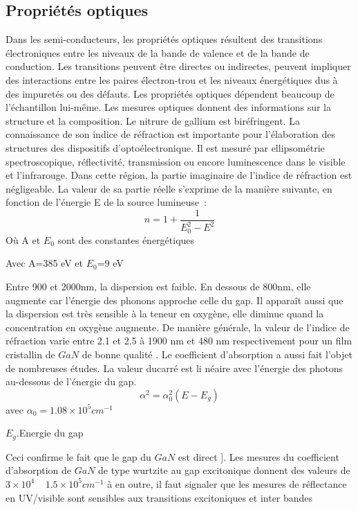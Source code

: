 \subsection{Propriétés optiques }
Dans les semi-conducteurs, les propriétés optiques résultent des transitions
électroniques entre les niveaux de la bande de valence et de la bande de conduction.
Les transitions peuvent être directes ou indirectes, peuvent impliquer des interactions
entre les paires électron-trou et les niveaux énergétiques dus à des impuretés ou des défauts. Les propriétés optiques dépendent beaucoup de l’échantillon lui-même. Les
mesures optiques donnent des informations sur la structure et la composition.
Le nitrure de gallium est biréfringent. La connaissance de son indice de réfraction
est importante pour l’élaboration des structures des dispositifs d’optoélectronique. Il
est mesuré par ellipsométrie spectroscopique, réflectivité, transmission ou encore
luminescence dans le visible et l’infrarouge. Dans cette région, la partie imaginaire de
l’indice de réfraction est négligeable.
La valeur de sa partie réelle s’exprime de la manière suivante, en fonction de
l’énergie E de la source lumineuse :
\begin{equation}\label{key}
	n=1+\dfrac{1}{E^{2}_{0}-E^{2}}
	\end{equation}  
Où A et  $ E_{0} $ sont des constantes énergétiques 

Avec A=385 eV et  $ E_{0} $=9 eV \cite{a9}
 
Entre 900 et 2000nm, la dispersion est faible. En dessous de 800nm, elle augmente car l’énergie des phonons approche celle du gap. Il apparaît aussi que la dispersion est très sensible à la teneur en oxygène, elle diminue quand la concentration en oxygène augmente.
De manière générale, la valeur de l’indice de réfraction varie entre 2.1 et 2.5 à 1900 nm et 480 nm respectivement pour un film cristallin de $ GaN $ de bonne qualité \cite{a10}.
Le coefficient d’absorption a aussi fait l’objet de nombreuses études. La valeur ducarré est li néaire avec l’énergie des photons au-dessous de l’énergie du gap.
\begin{equation}\label{key}
	\alpha^{2}=\alpha^{2}_{0}(E-E_{g})
\end{equation} 
	avec $ \alpha_{0}=1.08 × 10^{5}cm^{-1} $

$ E_{g} $.Energie du gap 

Ceci confirme le fait que le gap du $ GaN $ est direct \cite{a11}]. Les mesures du coefficient
d’absorption de $ GaN $ de type wurtzite au gap excitonique donnent des valeurs de $ 3 × 10^{4}   ~~~~~ 1.5 × 10^{5}cm^{-1} $
à  en outre, il faut signaler que les mesures de réflectance en
UV/visible sont sensibles aux transitions excitoniques et inter bandes\cite{a10} 

